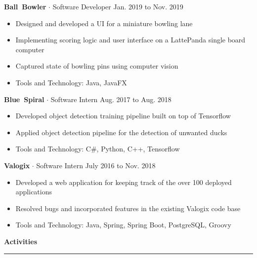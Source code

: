 \documentclass{article}
\newcommand{\rSection}[1] {
  \textcolor{header-blue} {
    \textbf{{\fontsize{0.5cm}{0.45cm}\selectfont \hbox{#1}}} \\
    \rule{0.30\textwidth}{0.1cm}
  }
}
\newcommand{\rSubSubSection}[1] {
  \textbf{{\fontsize{0.35cm}{0.45cm}\selectfont \hbox{#1}}}
}
\begin{document}
\rSubSubSection{Ball Bowler} $ \cdot $ Software Developer \hfill Jan. 2019 to Nov. 2019 \par
\vspace{-10pt}
\begin{itemize}
    \setlength\itemsep{0pt}
    \setlength{\parskip}{0pt}
    \item Designed and developed a UI for a miniature bowling lane
    \item Implementing scoring logic and user interface on a LattePanda single board computer
    \item Captured state of bowling pins using computer vision
    \item Tools and Technology: Java, JavaFX
\end{itemize}
\vspace{-10pt}

\rSubSubSection{Blue Spiral} $ \cdot $ Software Intern \hfill Aug. 2017 to Aug. 2018 \par
\vspace{-10pt}
\begin{itemize}
    \setlength\itemsep{0pt}
    \setlength{\parskip}{0pt}
    \item Developed object detection training pipeline built on top of Tensorflow
    \item Applied object detection pipeline for the detection of unwanted ducks
    \item Tools and Technology: C\#, Python, C++, Tensorflow
\end{itemize}
\vspace{-10pt}

\rSubSubSection{Valogix} $ \cdot $ Software Intern \hfill July 2016 to Nov. 2018 \par
\vspace{-10pt}
\begin{itemize}
    \setlength\itemsep{0pt}
    \setlength{\parskip}{0pt}
    \item Developed a web application for keeping track of the over 100 deployed applications
    \item Resolved bugs and incorporated features in the existing Valogix code base
    \item Tools and Technology: Java, Spring, Spring Boot, PostgreSQL, Groovy
\end{itemize}
\vspace{-10pt}

\rSection{Activities} \par
\end{document}
